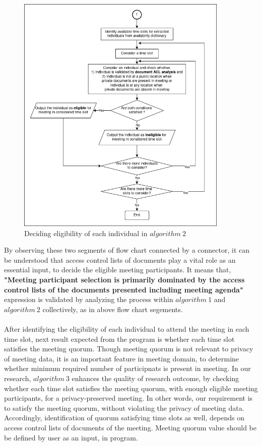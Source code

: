 \begin{figure}[H]
    \centering
    \includegraphics[width=0.9\textwidth]{./image/algo02_result_analysis.drawio.png}
    \caption{Deciding eligibility of each individual in $algorithm\ 2$}
    \label{fig:Deciding eligibility of each individual in algorithm 2}
\end{figure}
By observing these two segments of flow chart connected by a connector, it can be understood that access control lists of documents play a vital role as an essential input, to decide the eligible meeting participants. It means that, \textbf{"Meeting participant selection is primarily dominated by the access control lists of the documents presented including meeting agenda"} expression is validated by analyzing the process within $algorithm\ 1$ and $algorithm\ 2$ collectively, as in above flow chart segements.\\ \\ 
After identifying the eligibility of each individual to attend the meeting in each time slot, next result expected from the program is whether each time slot satisfies the meeting quorum. Though meeting quorum is not relevant to privacy of meeting data, it is an important feature in meeting domain, to determine whether minimum required number of participnats is present in meeting. In our research, $algorithm\ 3$ enhances the quality of research outcome, by checking whether each time slot satisfies the meeting quorum, with enough eligible meeting participants, for a privacy-preserved meeting. In other words, our requirement is to satisfy the meeting quorum, without violating the privacy of meeting data. Accordingly, identification of quorum satisfying time slots as well, depends on access control lists of documents of the meeting. Meeting quorum value should be be defined by user as an input, in program.\\ \\
